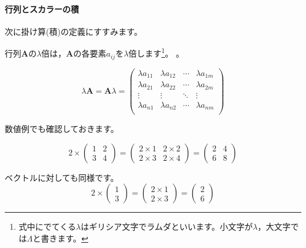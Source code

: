 \documentclass{ltjsbook}
\begin{document}
\paragraph{行列とスカラーの積}
次に掛け算(積)の定義にすすみます。

行列$\bm{A}$の$\lambda$倍は，$\bm{A}$の各要素$a_{ij}$を$\lambda$倍します\footnote{式中にでてくる$\lambda$はギリシア文字でラムダといいます。小文字が$\lambda$，大文字では$\Lambda$と書きます。}。
。


\begin{equation*}
	\lambda \bm{A} = \bm{A} \lambda =
	\begin{pmatrix}
		\lambda a_{11} & \lambda a_{12} & \cdots & \lambda a_{1m} \\
		\lambda a_{21} & \lambda a_{22} & \cdots & \lambda a_{2m} \\
		\vdots         & \vdots         & \ddots & \vdots         \\
		\lambda a_{n1} & \lambda a_{n2} & \cdots & \lambda a_{nm} \\
	\end{pmatrix}
\end{equation*}


数値例でも確認しておきます。

\begin{equation*}
	2 \times
	\begin{pmatrix}
		1 & 2 \\
		3 & 4
	\end{pmatrix}
	=
	\begin{pmatrix}
		2 \times 1 & 2 \times 2 \\
		2 \times 3 & 2 \times 4
	\end{pmatrix}
	=
	\begin{pmatrix}
		2 & 4 \\
		6 & 8
	\end{pmatrix}
\end{equation*}

ベクトルに対しても同様です。
\begin{equation*}
	2 \times
	\begin{pmatrix}
		1 \\
		3
	\end{pmatrix}
	=
	\begin{pmatrix}
		2 \times 1 \\
		2 \times 3
	\end{pmatrix}
	=
	\begin{pmatrix}
		2 \\
		6
	\end{pmatrix}
\end{equation*}
\end{document}
